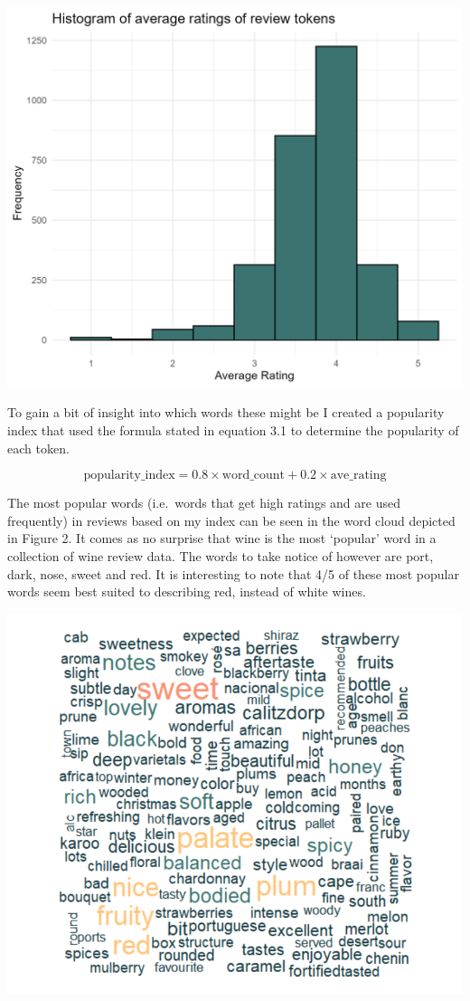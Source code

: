 \documentclass[11pt,preprint]{elsarticle}
\let\origfigure\figure
\let\endorigfigure\endfigure
\renewenvironment{figure}[1][2] {
    \expandafter\origfigure\expandafter[H]
} {
    \endorigfigure
}
\numberwithin{equation}{section}
\numberwithin{figure}{section}
\numberwithin{table}{section}
\begin{document}
\begin{figure}[H]
\includegraphics[width=0.8\linewidth]{writeup/fig1} \caption{Histogram of average ratings of review tokens}\label{fig:fig1}
\end{figure}

To gain a bit of insight into which words these might be I created a
popularity index that used the formula stated in equation 3.1 to
determine the popularity of each token.

\begin{equation}
    \text{popularity\_index} = 0.8 \times \text{word\_count} + 0.2 \times \text{ave\_rating}
\end{equation}

The most popular words (i.e.~words that get high ratings and are used
frequently) in reviews based on my index can be seen in the word cloud
depicted in Figure 2. It comes as no surprise that wine is the most
`popular' word in a collection of wine review data. The words to take
notice of however are port, dark, nose, sweet and red. It is interesting
to note that 4/5 of these most popular words seem best suited to
describing red, instead of white wines.

\begin{figure}[H]
\includegraphics[width=0.8\linewidth]{writeup/fig2} \caption{Word cloud of popular words in reviews based on popularity index}\label{fig:fig2}
\end{figure}
\end{document}
